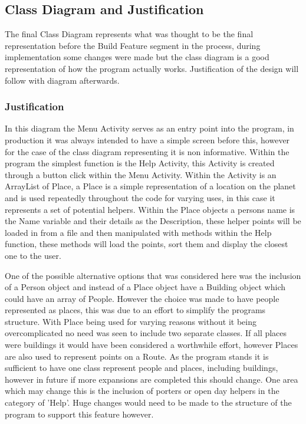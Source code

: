 \newpage
\subsection{Class Diagram and Justification}
The final Class Diagram represents what was thought to be the final representation before the Build Feature segment in the process, during implementation some changes were made but the class diagram is a good representation of how the program actually works. Justification of the design will follow with diagram afterwards. 
\subsubsection{Justification}
In this diagram the Menu Activity serves as an entry point into the program, in production it was always intended to have a simple screen before this, however for the case of the class diagram representing it is non informative. Within the program the simplest function is the Help Activity, this Activity is created through a button click within the Menu Activity. Within the Activity is an ArrayList of Place, a Place is a simple representation of a location on the planet and is used repeatedly throughout the code for varying uses, in this case it represents a set of potential helpers. Within the Place objects a persons name is the Name variable and their details as the Description, these helper points will be loaded in from a file and then manipulated with methods within the Help function, these methods will load the points, sort them and display the closest one to the user. 

One of the possible alternative options that was considered here was the inclusion of a Person object and instead of a Place object have a Building object which could have an array of People. However the choice was made to have people represented as places, this was due to an effort to simplify the programs structure. With Place being used for varying reasons without it being overcomplicated no need was seen to include two separate classes. If all places were buildings it would have been considered a worthwhile effort, however Places are also used to represent points on a Route. As the program stands it is sufficient to have one class represent people and places, including buildings, however in future if more expansions are completed this should change. One area which may change this is the inclusion of porters or open day helpers in the category of 'Help'. Huge changes would need to be made to the structure of the program to support this feature however.

